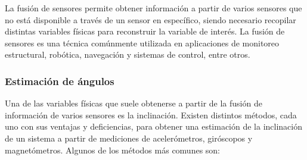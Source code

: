 La fusión de sensores permite obtener información a partir de varios sensores que no está disponible a través de un sensor en específico, siendo necesario recopilar distintas variables físicas para reconstruir la variable de interés. La fusión de sensores es una técnica comúnmente utilizada en aplicaciones de monitoreo estructural, robótica, navegación y sistemas de control, entre otros.

\subsubsection{Estimación de ángulos}

Una de las variables físicas que suele obtenerse a partir de la fusión de información de varios sensores es la inclinación. Existen distintos métodos, cada uno con sus ventajas y deficiencias, para obtener una estimación de la inclinación de un sistema a partir de mediciones de acelerómetros, giróscopos y magnetómetros. Algunos de los métodos más comunes son:

